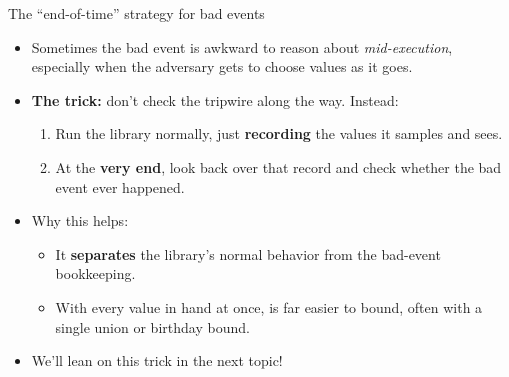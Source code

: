 \ifdefined\PRESENTATION\else\PassOptionsToClass{handout}{beamer}\fi\documentclass[aspectratio=169, lualatex]{beamer}
\begin{document}
\begin{frame}{The ``end-of-time'' strategy for bad events}
	\begin{itemize}[<+->]
		\item Sometimes the bad event is awkward to reason about \textit{mid-execution}, especially when the adversary gets to choose values as it goes.
		\item \textbf{The trick:} don't check the tripwire along the way. Instead:
		      \begin{enumerate}
			      \item Run the library normally, just \textbf{recording} the values it samples and sees.
			      \item At the \textbf{very end}, look back over that record and check whether the bad event ever happened.
		      \end{enumerate}
		\item Why this helps:
		      \begin{itemize}
			      \item It \textbf{separates} the library's normal behavior from the bad-event bookkeeping.
			      \item With every value in hand at once,  is far easier to bound, often with a single union or birthday bound.
		      \end{itemize}
		\item We'll lean on this trick in the next topic!
	\end{itemize}
\end{frame}
\end{document}
